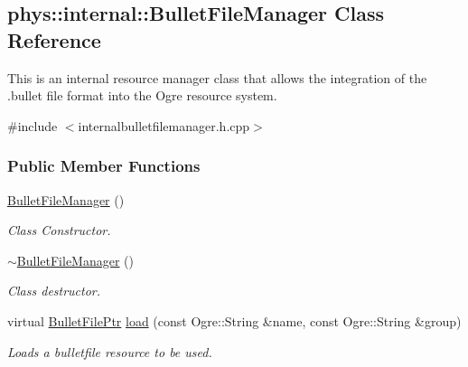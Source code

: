 \hypertarget{classphys_1_1internal_1_1BulletFileManager}{
\subsection{phys::internal::BulletFileManager Class Reference}
\label{d0/d84/classphys_1_1internal_1_1BulletFileManager}
}


This is an internal resource manager class that allows the integration of the .bullet file format into the Ogre resource system.  




{\ttfamily \#include $<$internalbulletfilemanager.h.cpp$>$}

\subsubsection*{Public Member Functions}
\begin{DoxyCompactItemize}
\item 
\hypertarget{classphys_1_1internal_1_1BulletFileManager_a93e2849b098764ef30b2933da5da9696}{
\hyperlink{classphys_1_1internal_1_1BulletFileManager_a93e2849b098764ef30b2933da5da9696}{BulletFileManager} ()}
\label{d0/d84/classphys_1_1internal_1_1BulletFileManager_a93e2849b098764ef30b2933da5da9696}

\begin{DoxyCompactList}\small\item\em Class Constructor. \item\end{DoxyCompactList}\item 
\hypertarget{classphys_1_1internal_1_1BulletFileManager_a1554959d6fcbc1cbb23c7f09bffef023}{
\hyperlink{classphys_1_1internal_1_1BulletFileManager_a1554959d6fcbc1cbb23c7f09bffef023}{$\sim$BulletFileManager} ()}
\label{d0/d84/classphys_1_1internal_1_1BulletFileManager_a1554959d6fcbc1cbb23c7f09bffef023}

\begin{DoxyCompactList}\small\item\em Class destructor. \item\end{DoxyCompactList}\item 
virtual \hyperlink{classphys_1_1internal_1_1BulletFilePtr}{BulletFilePtr} \hyperlink{classphys_1_1internal_1_1BulletFileManager_a7c2dff7475d112bd525c29882f731603}{load} (const Ogre::String \&name, const Ogre::String \&group)
\begin{DoxyCompactList}\small\item\em Loads a bulletfile resource to be used. \item\end{DoxyCompactList}\end{DoxyCompactItemize}
